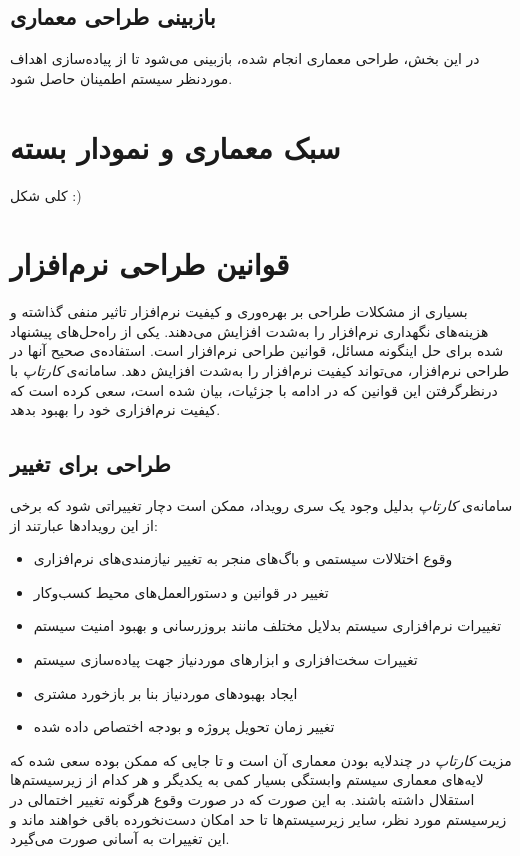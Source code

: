 \documentclass[12pt,svgnames,oneside]{book}
\begin{document}
\subsection{بازبینی طراحی معماری}
در این بخش، طراحی معماری انجام شده، بازبینی می‌شود تا از پیاده‌سازی اهداف موردنظر سیستم اطمینان حاصل شود.

\section{سبک‌ معماری و نمودار بسته}
کلی شکل :)

\section{قوانین طراحی نرم‌افزار}
بسیاری از مشکلات طراحی بر بهره‌وری و کیفیت نرم‌افزار تاثیر منفی گذاشته و هزینه‌های نگهداری نرم‌افزار را به‌شدت افزایش می‌دهند. یکی از راه‌حل‌های پیشنهاد شده برای حل اینگونه مسائل، قوانین طراحی نرم‌افزار است. استفاده‌ی صحیح آنها در طراحی نرم‌افزار، می‌تواند کیفیت نرم‌افزار را به‌شدت افزایش دهد. سامانه‌ی \textit{کارتاپ} با درنظرگرفتن این قوانین که در ادامه با جزئیات، بیان شده است، سعی کرده است که کیفیت نرم‌افزاری خود را بهبود بدهد.

\subsection{طراحی برای تغییر}
سامانه‌ی \textit{کارتاپ} بدلیل وجود یک سری رویداد، ممکن است دچار تغییراتی شود که برخی از این رویداد‌ها عبارتند از:

\begin{itemize}
\item 
وقوع اختلالات سیستمی و باگ‌های منجر به تغییر نیاز‌مندی‌های نرم‌افزاری

\item 
تغییر در قوانین و دستور‌العمل‌های محیط کسب‌وکار

\item 
تغییرات نرم‌افزاری سیستم بدلایل مختلف مانند بروزرسانی و بهبود امنیت سیستم

\item 
تغییرات سخت‌افزاری و ابزار‌های موردنیاز جهت پیاده‌سازی سیستم

\item 
ایجاد بهبود‌های موردنیاز‌ بنا بر بازخورد مشتری

\item 
تغییر زمان تحویل پروژه و بودجه اختصاص داده شده
\end{itemize}

مزیت \textit{کارتاپ} در چندلایه بودن معماری آن است و تا جایی که ممکن بوده سعی شده که لایه‌های معماری سیستم وابستگی بسیار کمی به یکدیگر و هر کدام از زیرسیستم‌ها استقلال داشته باشند. به این صورت که در صورت وقوع هرگونه تغییر اختمالی در زیرسیستم مورد نظر، سایر زیرسیستم‌ها تا حد امکان دست‌نخورده باقی خواهند ماند و این تغییرات به‌ آسانی صورت می‌گیرد.
\end{document}
